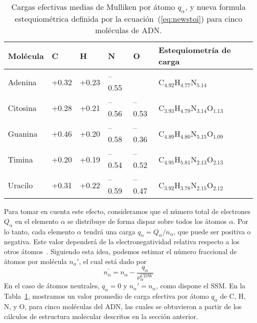 \begin{table}
\begin{center}
\begin{tabular}{|p{}|p{}|p{}|p{
}|p{}|p{}|}
\hline
Molécula & C & H & N & O & Estequiometría de carga \\
\hline
Adenina & +0.32 & +0.23 & --0.55 &       & 
C$_{4.92}$H$_{4.77}$N$_{5.14}$ \\ 
\hline
Citosina & +0.28 & +0.21 & --0.56 & --0.53 & 
C$_{3.93}$H$_{4.79}$N$_{3.14}$O$_{1.13}$ \\ 
\hline
Guanina & +0.46 & +0.20 & --0.58 & --0.36 & 
C$_{4.89}$H$_{4.80}$N$_{5.15}$O$_{1.09}$ \\ 
\hline
Timina & +0.20 & +0.19 & --0.54 & --0.52 & 
C$_{4.95}$H$_{5.81}$N$_{2.13}$O$_{2.13}$ \\ 
\hline
Uracilo & +0.31 & +0.22 & --0.59 & --0.47 & 
C$_{3.92}$H$_{3.78}$N$_{2.15}$O$_{2.12}$ \\ 
\hline
\end{tabular}
\caption[Cargas efectivas medias de Mulliken por átomo]
{Cargas efectivas medias de Mulliken por átomo $q_{\alpha}$, y nueva formula
estequiométrica definida por la ecuación~(\ref{eq:newstoi}) para cinco
moléculas de ADN.}
\label{tab:newstoi}
\end{center}
\end{table}

Para tomar en cuenta este efecto, consideramos que el número total de 
electrones $Q_{\alpha }$ en el elemento $\alpha$ se distribuye de forma
dispar sobre todos los átomos $\alpha$. Por lo tanto, cada elemento  
$\alpha$ tendrá una carga $q_{\alpha}=Q_{\alpha}/n_{\alpha}$, que puede 
ser positiva o negativa. Este valor dependerá de la electronegatividad 
relativa respecto a los otros átomos~\cite{rappe1991}. Siguiendo esta 
idea, podemos estimar el número fraccional de átomos por molécula 
$n_{\alpha}'$, el cual está dado por 
\begin{equation}
n_{\alpha }^{\prime }=n_{\alpha }-
\frac{q_{\alpha }}{\nu_{\alpha }^{\text{CDW}}}
\label{eq:newstoi}
\end{equation}
En el caso de átomos neutrales, $q_{\alpha}=0$ y $n_{\alpha}'=n_{\alpha}$,
como dispone el SSM. En la Tabla~\ref{tab:newstoi}, mostramos un valor 
promedio de carga efectiva por átomo $q_{\alpha}$ de C, H, N, y O, para 
cinco moléculas del ADN, las cuales se obtuvieron a partir de los 
cálculos de estructura molecular descritos en la sección anterior.

